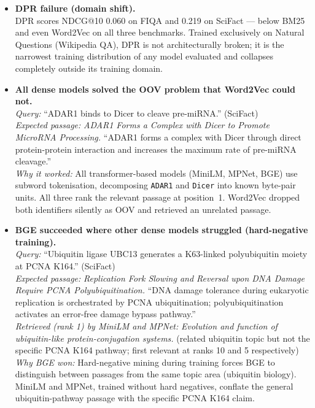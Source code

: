 \documentclass[12pt, a4paper]{article}
\makeatletter
\newcommand{\ndcg}{NDCG@10}
\newcommand{\fiqa}{FIQA}
\newcommand{\scifact}{SciFact}
\makeatother
\begin{document}
\begin{itemize}

\item \textbf{DPR failure (domain shift).}\\
  DPR scores \ndcg{} 0.060 on \fiqa{} and 0.219 on \scifact{} — below BM25
  and even Word2Vec on all three benchmarks.  Trained exclusively on Natural
  Questions (Wikipedia QA), DPR is not architecturally broken; it is the
  narrowest training distribution of any model evaluated and collapses
  completely outside its training domain.

\item \textbf{All dense models solved the OOV problem that Word2Vec could not.}\\
  \textit{Query:} ``ADAR1 binds to Dicer to cleave pre-miRNA.'' (\scifact{})\\
  \textit{Expected passage:} \textit{ADAR1 Forms a Complex with Dicer to Promote
    MicroRNA Processing.} ``ADAR1 forms a complex with Dicer through direct
    protein-protein interaction and increases the maximum rate of pre-miRNA
    cleavage.''\\
  \textit{Why it worked:} All transformer-based models (MiniLM, MPNet, BGE) use
    subword tokenisation, decomposing \texttt{ADAR1} and \texttt{Dicer} into
    known byte-pair units.  All three rank the relevant passage at position~1.
    Word2Vec dropped both identifiers silently as OOV and retrieved an unrelated
    passage.

\item \textbf{BGE succeeded where other dense models struggled (hard-negative training).}\\
  \textit{Query:} ``Ubiquitin ligase UBC13 generates a K63-linked polyubiquitin
    moiety at PCNA K164.'' (\scifact{})\\
  \textit{Expected passage:} \textit{Replication Fork Slowing and Reversal upon
    DNA Damage Require PCNA Polyubiquitination.} ``DNA damage tolerance during
    eukaryotic replication is orchestrated by PCNA ubiquitination; polyubiquitination
    activates an error-free damage bypass pathway.''\\
  \textit{Retrieved (rank 1) by MiniLM and MPNet:} \textit{Evolution and function
    of ubiquitin-like protein-conjugation systems.} (related ubiquitin topic
    but not the specific PCNA K164 pathway; first relevant at ranks 10 and 5
    respectively)\\
  \textit{Why BGE won:} Hard-negative mining during training forces BGE to
    distinguish between passages from the same topic area (ubiquitin biology).
    MiniLM and MPNet, trained without hard negatives, conflate the general
    ubiquitin-pathway passage with the specific PCNA K164 claim.


\end{itemize}
\end{document}
